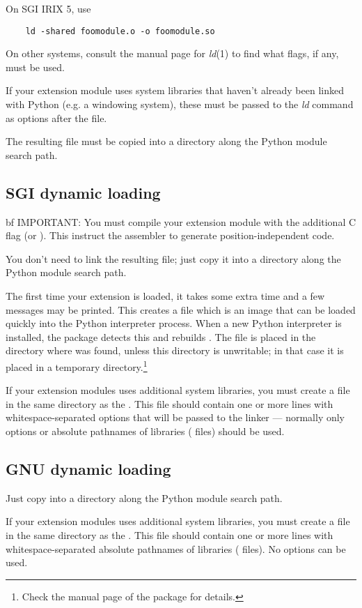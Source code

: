 On SGI IRIX 5, use
\begin{verbatim}
    ld -shared foomodule.o -o foomodule.so
\end{verbatim}

On other systems, consult the manual page for {\em ld}(1) to find what
flags, if any, must be used.

If your extension module uses system libraries that haven't already
been linked with Python (e.g. a windowing system), these must be
passed to the {\em ld} command as  options after the
 file.

The resulting file  must be copied into a directory
along the Python module search path.


\subsection{SGI dynamic loading}

{bf IMPORTANT:} You must compile your extension module with the
additional C flag  (or ).  This instruct the
assembler to generate position-independent code.

You don't need to link the resulting  file; just
copy it into a directory along the Python module search path.

The first time your extension is loaded, it takes some extra time and
a few messages may be printed.  This creates a file
 which is an image that can be loaded quickly into
the Python interpreter process.  When a new Python interpreter is
installed, the  package detects this and rebuilds
.  The file  is placed in the
directory where  was found, unless this directory is
unwritable; in that case it is placed in a temporary
directory.\footnote{Check the manual page of the  package for
details.}

If your extension modules uses additional system libraries, you must
create a file  in the same directory as the
.  This file should contain one or more lines with
whitespace-separated options that will be passed to the linker ---
normally only  options or absolute pathnames of libraries
( files) should be used.


\subsection{GNU dynamic loading}

Just copy  into a directory along the Python module
search path.

If your extension modules uses additional system libraries, you must
create a file  in the same directory as the
.  This file should contain one or more lines with
whitespace-separated absolute pathnames of libraries (
files).  No  options can be used.






